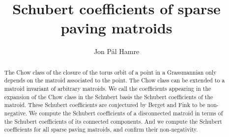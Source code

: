 \documentclass[a4paper,american,11pt, reqno]{amsart}
\begin{document}
\title{Schubert coefficients of sparse paving matroids}
\author[Schubert coefficients of sparse paving matroids]{Jon Pål Hamre}


\begin{abstract}
The Chow class of the closure of the torus orbit of a point in a Grassmannian only depends on the matroid associated to the point. The Chow class can be extended to a matroid invariant of arbitrary matroids. We call the coefficients appearing in the expansion of the Chow class in the Schubert basis the Schubert coefficients of the matroid. These Schubert coefficients are conjectured by Berget and Fink to be non-negative. We compute the Schubert coefficients of a disconnected matroid in terms of the Schubert coefficients of its connected components. And we compute the Schubert coefficients for all sparse paving matroids, and confirm their non-negativity.
\end{abstract}

\maketitle










\printbibliography
\end{document}
